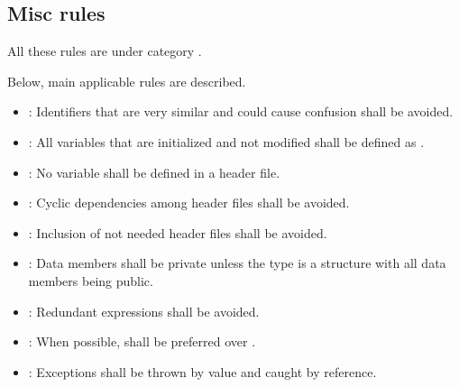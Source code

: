 \subsection{Misc rules}

All these rules are under category
.

Below, main applicable rules are described.

\begin{itemize}

\item {}:
Identifiers that are very similar and could cause confusion shall be avoided.

\item {}:
All variables that are initialized and not modified shall be defined as
.

\item {}:
No variable shall be defined in a header file.

\item {}:
Cyclic dependencies among header files shall be avoided.

\item {}:
Inclusion of not needed header files shall be avoided.

\item {}:
Data members shall be private unless the type is a structure with
all data members being public.

\item {}:
Redundant expressions shall be avoided.

\item {}:
When possible,  shall be preferred over .

\item {}:
Exceptions shall be thrown by value and caught by reference.

\end{itemize}
